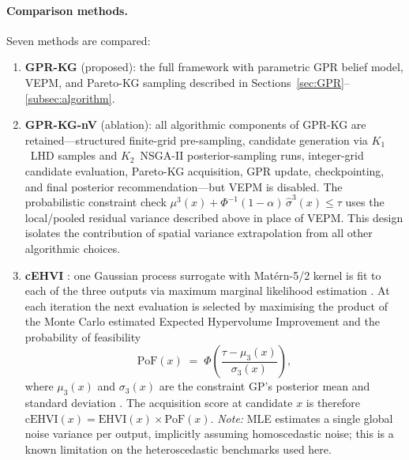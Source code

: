 \documentclass[12pt]{article}
\theoremstyle{plain}
\theoremstyle{definition}
\theoremstyle{remark}
\begin{document}
\paragraph{Comparison methods.}
Seven methods are compared:
\begin{enumerate}[label=(\arabic*),leftmargin=2.5em]

  \item \textbf{GPR-KG} (proposed): the full framework with parametric
    GPR belief model, VEPM, and Pareto-KG sampling described in
    Sections~\ref{sec:GPR}--\ref{subsec:algorithm}.

  \item \textbf{GPR-KG-nV} (ablation): all algorithmic components of
    GPR-KG are retained---structured finite-grid pre-sampling, candidate
    generation via $K_1$~LHD samples and $K_2$~NSGA-II posterior-sampling
    runs, integer-grid candidate evaluation, Pareto-KG acquisition, GPR
    update, checkpointing, and final posterior recommendation---but VEPM
    is disabled.  The probabilistic constraint check
    $\mu^3(x)+\Phi^{-1}(1-\alpha)\,\hat\sigma^3(x)\le\tau$ uses the
    local/pooled residual variance described above in place of VEPM.
    This design isolates the contribution of spatial variance
    extrapolation from all other algorithmic choices.

  \item \textbf{cEHVI} \citep{Daulton2020,Daulton2021}: one Gaussian
    process surrogate with Mat\'ern-5/2 kernel is fit to each of the three
    outputs via maximum marginal likelihood estimation \citep{Balandat2020}.
    At each iteration the next evaluation is selected by maximising the
    product of the Monte Carlo estimated Expected Hypervolume Improvement
    \citep{Daulton2020} and the probability of feasibility
    \begin{equation*}
      \mathrm{PoF}(x) \;=\; \Phi\!\left(\frac{\tau - \mu_3(x)}{\sigma_3(x)}\right),
    \end{equation*}
    where $\mu_3(x)$ and $\sigma_3(x)$ are the constraint GP's posterior
    mean and standard deviation \citep{Gelbart2014}.  The acquisition score
    at candidate $x$ is therefore $\mathrm{cEHVI}(x)=\mathrm{EHVI}(x)\times\mathrm{PoF}(x)$.
    \emph{Note:} MLE estimates a single global noise variance per output,
    implicitly assuming homoscedastic noise; this is a known limitation
    on the heteroscedastic benchmarks used here.


\end{enumerate}
\end{document}
